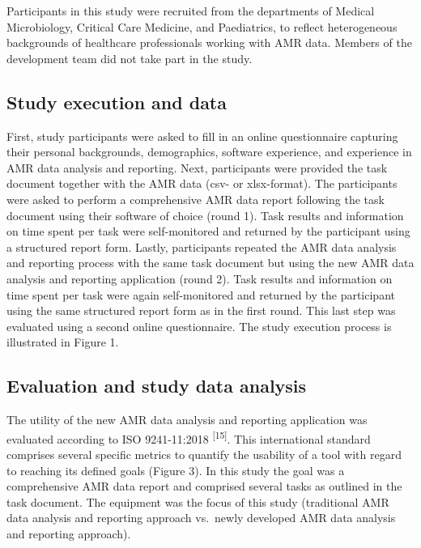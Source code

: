 \documentclass[
]{book}
\begin{document}
Participants in this study were recruited from the departments of Medical Microbiology, Critical Care Medicine, and Paediatrics, to reflect heterogeneous backgrounds of healthcare professionals working with AMR data. Members of the development team did not take part in the study.

\hypertarget{study-execution-and-data}{%
\subsection{Study execution and data}\label{study-execution-and-data}}

First, study participants were asked to fill in an online questionnaire capturing their personal backgrounds, demographics, software experience, and experience in AMR data analysis and reporting. Next, participants were provided the task document together with the AMR data (csv- or xlsx-format). The participants were asked to perform a comprehensive AMR data report following the task document using their software of choice (round 1). Task results and information on time spent per task were self-monitored and returned by the participant using a structured report form. Lastly, participants repeated the AMR data analysis and reporting process with the same task document but using the new AMR data analysis and reporting application (round 2). Task results and information on time spent per task were again self-monitored and returned by the participant using the same structured report form as in the first round. This last step was evaluated using a second online questionnaire. The study execution process is illustrated in Figure 1.

\hypertarget{evaluation-and-study-data-analysis}{%
\subsection{Evaluation and study data analysis}\label{evaluation-and-study-data-analysis}}

The utility of the new AMR data analysis and reporting application was evaluated according to ISO 9241-11:2018 \textsuperscript{{[}15{]}}. This international standard comprises several specific metrics to quantify the usability of a tool with regard to reaching its defined goals (Figure 3). In this study the goal was a comprehensive AMR data report and comprised several tasks as outlined in the task document. The equipment was the focus of this study (traditional AMR data analysis and reporting approach vs.~newly developed AMR data analysis and reporting approach).
\end{document}
